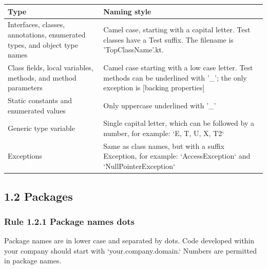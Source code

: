 \begin{center}

\begin{tabular}{ |p{}|p{}| }

\hline

Type&Naming style\\

\hline

 Interfaces, classes, annotations, enumerated types, and object type names & Camel case, starting with a capital letter. Test classes have a Test suffix. The filename is 'TopClassName'.kt.  \\

 Class fields, local variables, methods, and method parameters & Camel case starting with a low case letter. Test methods can be underlined with '\_'; the only exception is [backing properties]\\

 Static constants and enumerated values & Only uppercase underlined with '\_' \\

 Generic type variable & Single capital letter, which can be followed by a number, for example: `E, T, U, X, T2` \\

 Exceptions & Same as class names, but with a suffix Exception, for example: `AccessException` and `NullPointerException`\\

\hline

\end{tabular}

\end{center}

\subsection*{\textbf{1.2 Packages}}

\label{sec:1.2}



\subsubsection*{\textbf{Rule 1.2.1 Package names dots}}
\leavevmode\newline

\label{sec:}

Package names are in lower case and separated by dots. Code developed within your company should start with `your.company.domain.` Numbers are permitted in package names.

